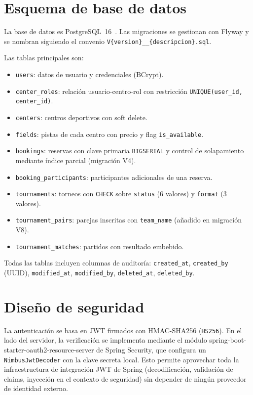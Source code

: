 \section{Esquema de base de datos}
\label{sec:esquema_bd}

La base de datos es PostgreSQL~16~\cite{postgresql}. Las migraciones se gestionan con Flyway y se
nombran siguiendo el convenio \texttt{V\{version\}\_\_\{descripcion\}.sql}.

Las tablas principales son:

\begin{itemize}
  \item \texttt{users}: datos de usuario y credenciales (BCrypt).
  \item \texttt{center\_roles}: relación usuario-centro-rol con restricción
    \texttt{UNIQUE(user\_id, center\_id)}.
  \item \texttt{centers}: centros deportivos con soft delete.
  \item \texttt{fields}: pistas de cada centro con precio y flag
    \texttt{is\_available}.
  \item \texttt{bookings}: reservas con clave primaria \texttt{BIGSERIAL} y
    control de solapamiento mediante índice parcial (migración V4).
  \item \texttt{booking\_participants}: participantes adicionales de una reserva.
  \item \texttt{tournaments}: torneos con \texttt{CHECK} sobre \texttt{status}
    (6 valores) y \texttt{format} (3 valores).
  \item \texttt{tournament\_pairs}: parejas inscritas con \texttt{team\_name}
    (añadido en migración V8).
  \item \texttt{tournament\_matches}: partidos con resultado embebido.
\end{itemize}

Todas las tablas incluyen columnas de auditoría: \texttt{created\_at},
\texttt{created\_by} (UUID), \texttt{modified\_at}, \texttt{modified\_by},
\texttt{deleted\_at}, \texttt{deleted\_by}.

\section{Diseño de seguridad}
\label{sec:diseno_seguridad}

La autenticación se basa en JWT firmados con HMAC-SHA256 (\texttt{HS256}).
En el lado del servidor, la verificación se implementa mediante el módulo
{\ttfamily spring-\-boot-\-starter-\-oauth2-\-resource-\-server} de Spring Security, que
configura un \texttt{NimbusJwtDecoder} con la clave secreta local. Esto permite
aprovechar toda la infraestructura de integración JWT de Spring
(decodificación, validación de claims, inyección en el contexto de seguridad)
sin depender de ningún proveedor de identidad externo.

